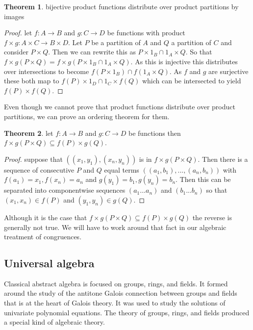 \documentclass[a4paper,11pt, notitlepage]{report}
\theoremstyle{definition}
\newtheorem{theorem}{Theorem}[section]
\begin{document}
\begin{theorem} bijective product functions distribute over product partitions by images
\end{theorem}

\begin{proof}
let $f: A \to B$ and $g: C \to D$ be functions with product $f \times g : A \times C \to B \times D$. Let $P$ be a partition of $A$ and $Q$ a partition of $C$ and consider $P \times Q$. Then we can rewrite this as $P \times 1_B \cap 1_A \times Q$. So that $f\times g(P \times Q) = f \times g(P \times 1_B \cap 1_A \times Q)$. As this is injective this distributes over intersections to become $f(P \times 1_B) \cap f(1_A \times Q)$. As $f$ and $g$ are surjective these both map to $f(P) \times 1_D \cap 1_C \times f(Q)$ which can be intersected to yield $f(P) \times f(Q)$.
\end{proof}

Even though we cannot prove that product functions distribute over product partitions, we can prove an ordering theorem for them.

\begin{theorem}
let $f: A \to B$ and $g: C \to D$ be functions then $f \times g(P \times Q) \subseteq f(P) \times g(Q)$.
\end{theorem}

\begin{proof}
suppose that $((x_1,y_1),(x_n,y_n))$ is in $f \times g(P \times Q)$. Then there is a sequence of consecutive $P$ and $Q$ equal terms $((a_1,b_1),...,(a_n,b_n))$ with $f(a_1) = x_1, f(x_n) = a_n$ and $g(y_1) = b_1, g(y_n) = b_n$. Then this can be separated into componentwise sequences $(a_1 ... a_n)$ and $(b_1 ... b_n)$ so that $(x_1, x_n) \in f(P)$ and $(y_1, y_n) \in g(Q)$.
\end{proof}

Although it is the case that $f \times g(P \times Q) \subseteq f(P) \times g(Q)$ the reverse is generally not true. We will have to work around that fact in our algebraic treatment of congruences.

\newpage

\subsection{Universal algebra}
Classical abstract algebra is focused on groups, rings, and fields. It formed around the study of the antitone Galois connection between groups and fields that is at the heart of Galois theory. It was used to study the solutions of univariate polynomial equations. The theory of groups, rings, and fields produced a special kind of algebraic theory.
\end{document}
